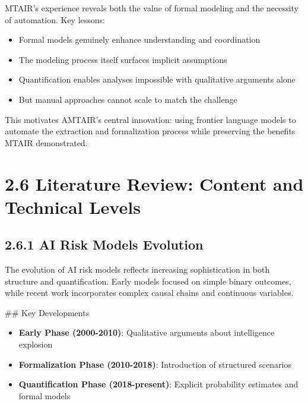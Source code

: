 \documentclass[
  11pt,
  letterpaper,
]{book}
\providecommand{\tightlist}{%
  \setlength{\itemsep}{0pt}\setlength{\parskip}{0pt}}
\begin{document}
MTAIR's experience reveals both the value of formal modeling and the
necessity of automation. Key lessons:

\begin{itemize}
\tightlist
\item
  Formal models genuinely enhance understanding and coordination
\item
  The modeling process itself surfaces implicit assumptions
\item
  Quantification enables analyses impossible with qualitative arguments
  alone
\item
  But manual approaches cannot scale to match the challenge
\end{itemize}

This motivates AMTAIR's central innovation: using frontier language
models to automate the extraction and formalization process while
preserving the benefits MTAIR demonstrated.

\section*{2.6 Literature Review: Content and Technical
Levels}\label{sec-literature-review}


\subsection*{2.6.1 AI Risk Models
Evolution}\label{sec-risk-models-evolution}

The evolution of AI risk models reflects increasing sophistication in
both structure and quantification. Early models focused on simple binary
outcomes, while recent work incorporates complex causal chains and
continuous variables.

\begin{tcolorbox}[enhanced jigsaw, opacitybacktitle=0.6, colbacktitle=quarto-callout-note-color!10!white, toptitle=1mm, colback=white, breakable, left=2mm, bottomrule=.15mm, title=\textcolor{quarto-callout-note-color}{\faInfo}\hspace{0.5em}{Note}, rightrule=.15mm, arc=.35mm, toprule=.15mm, opacityback=0, colframe=quarto-callout-note-color-frame, bottomtitle=1mm, titlerule=0mm, leftrule=.75mm, coltitle=black]

\#\# Key Developments

\begin{itemize}
\tightlist
\item
  \textbf{Early Phase (2000-2010)}: Qualitative arguments about
  intelligence explosion
\item
  \textbf{Formalization Phase (2010-2018)}: Introduction of structured
  scenarios
\item
  \textbf{Quantification Phase (2018-present)}: Explicit probability
  estimates and formal models
\end{itemize}

\end{tcolorbox}
\end{document}
